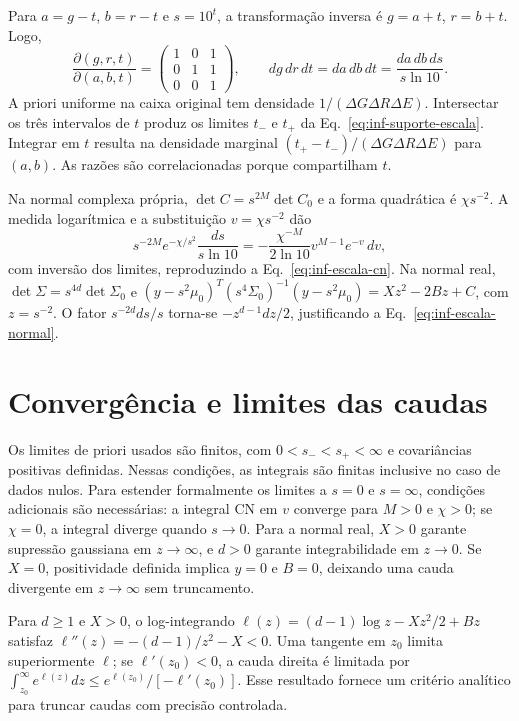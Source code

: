 Para $a=g-t$, $b=r-t$ e $s=10^t$, a transformação inversa é $g=a+t$, $r=b+t$. Logo,
\begin{equation}
 \frac{\partial(g,r,t)}{\partial(a,b,t)}=
 \begin{pmatrix}1&0&1\\0&1&1\\0&0&1\end{pmatrix},
 \qquad dg\,dr\,dt=da\,db\,dt=\frac{da\,db\,ds}{s\ln10}.
\end{equation}
A priori uniforme na caixa original tem densidade $1/(\Delta G\Delta R\Delta E)$. Intersectar os três intervalos de $t$ produz os limites $t_-$ e $t_+$ da Eq.~\eqref{eq:inf-suporte-escala}. Integrar em $t$ resulta na densidade marginal $(t_+-t_-)/(\Delta G\Delta R\Delta E)$ para $(a,b)$. As razões são correlacionadas porque compartilham $t$.

Na normal complexa própria, $\det C=s^{2M}\det C_0$ e a forma quadrática é $\chi s^{-2}$. A medida logarítmica e a substituição $v=\chi s^{-2}$ dão
\begin{equation}
 s^{-2M}e^{-\chi/s^2}\frac{ds}{s\ln10}
 =-\frac{\chi^{-M}}{2\ln10}v^{M-1}e^{-v}\,dv,
\end{equation}
com inversão dos limites, reproduzindo a Eq.~\eqref{eq:inf-escala-cn}. Na normal real, $\det\Sigma=s^{4d}\det\Sigma_0$ e
$(y-s^2\mu_0)^T(s^4\Sigma_0)^{-1}(y-s^2\mu_0)=Xz^2-2Bz+C$, com $z=s^{-2}$. O fator $s^{-2d}ds/s$ torna-se $-z^{d-1}dz/2$, justificando a Eq.~\eqref{eq:inf-escala-normal}.

\section{Convergência e limites das caudas}

Os limites de priori usados são finitos, com $0<s_-<s_+<\infty$ e covariâncias positivas definidas. Nessas condições, as integrais são finitas inclusive no caso de dados nulos. Para estender formalmente os limites a $s=0$ e $s=\infty$, condições adicionais são necessárias: a integral CN em $v$ converge para $M>0$ e $\chi>0$; se $\chi=0$, a integral diverge quando $s\to0$. Para a normal real, $X>0$ garante supressão gaussiana em $z\to\infty$, e $d>0$ garante integrabilidade em $z\to0$. Se $X=0$, positividade definida implica $y=0$ e $B=0$, deixando uma cauda divergente em $z\to\infty$ sem truncamento.

Para $d\geq1$ e $X>0$, o log-integrando
$\ell(z)=(d-1)\log z-Xz^2/2+Bz$ satisfaz
$\ell''(z)=-(d-1)/z^2-X<0$. Uma tangente em $z_0$ limita superiormente $\ell$; se $\ell'(z_0)<0$, a cauda direita é limitada por
$\int_{z_0}^\infty e^{\ell(z)}dz\leq e^{\ell(z_0)}/[-\ell'(z_0)]$.
Esse resultado fornece um critério analítico para truncar caudas com precisão controlada.

